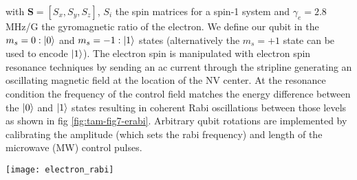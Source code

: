 with $\mathbf{S} =[S_x,S_y,S_z]$,  $S_i$ the spin matrices for a spin-1 system and $\gamma_e = 2.8$ MHz/G the gyromagnetic ratio of the electron. We define our qubit in the $m_s = 0 :\left|0\right>$ and $m_s = -1 : \left|1\right>$ states (alternatively the $m_s = + 1$ state can be used to encode $\left|1\right>$). The electron spin is manipulated with electron spin resonance techniques by sending an ac current through the stripline generating an oscillating magnetic field at the location of the NV center. At the resonance condition the frequency of the control field matches the energy difference between the $\left|0\right>$ and $\left|1\right>$ states resulting in coherent Rabi oscillations between those levels as shown in fig \ref{fig:tam-fig7-erabi}. Arbitrary qubit rotations are implemented by calibrating the amplitude (which sets the rabi frequency) and length of the microwave (MW) control pulses.

\label{sec:groundstatecontrol}
\begin{figure*}
	\centering
	\texttt{[image: electron\_rabi]}
	\caption{\label{fig:tam-fig7-erabi} \textbf{} (a) Coherent qubit rotations of the electron spin are performed by varying the length of a MW pulse. Solid line is a sinusoidal fit from which we determine the Rabi frequency $(7.67 \pm 0.02)$ MHz. (b) Ramsey measurements for two different NV centers where the wait time between two $\pi$/2 pulses is varied. From a fit to equation \ref{eq:tam-ramsey} we find $T_2^{*} = (0.96 \pm 0.03)$ and $(3.09 \pm 0.05) \mu$s for the upper and lower panel respectively. The coupling to the nitrogen spin is $A_{\parallel} = (2.20 \pm 0.01)$ and $(2.195 \pm 0.002) $MHz. For the bottom panel two additional frequency components are included in the fit to account for the strongly coupled $^{13}C$. We find a coupling strength of ($384 \pm 3$) kHz.  All datapoints are corrected to account for imperfect readout and initialization.}
\end{figure*}



